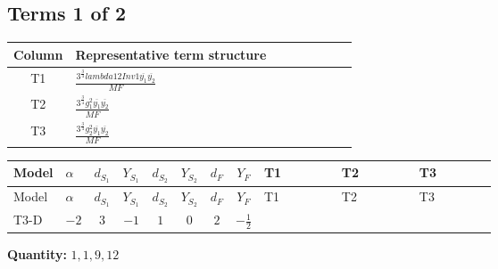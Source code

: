 \documentclass[8pt]{article}
\begin{document}
\begin{landscape}
\subsection*{Terms 1 of 2}
\begin{center}
\begin{tabular}{@{}c >{\raggedright\arraybackslash}p{0.82\linewidth}@{}}
\toprule
Column & Representative term structure \\
\midrule
T1 & \(\displaystyle \frac{3^{\frac{3}{4}} lambda12Inv1 \overline{y_{1}} \overline{y_{2}}}{MF}\) \\
\midrule
T2 & \(\displaystyle \frac{3^{\frac{3}{4}} g_{1}^{2} \overline{y_{1}} \overline{y_{2}}}{MF}\) \\
\midrule
T3 & \(\displaystyle \frac{3^{\frac{3}{4}} g_{2}^{2} \overline{y_{1}} \overline{y_{2}}}{MF}\) \\
\midrule
\bottomrule
\end{tabular}
\end{center}
\smallskip
\tiny
\begin{longtable}{@{}llcccccc >{\raggedright\arraybackslash}p{0.21\linewidth} >{\raggedright\arraybackslash}p{0.21\linewidth} >{\raggedright\arraybackslash}p{0.21\linewidth}@{}}
\toprule
Model & $\alpha$ & $d_{S_1}$ & $Y_{S_1}$ & $d_{S_2}$ & $Y_{S_2}$ & $d_F$ & $Y_F$ & T1 & T2 & T3 \\
\midrule
\endfirsthead
\toprule
Model & $\alpha$ & $d_{S_1}$ & $Y_{S_1}$ & $d_{S_2}$ & $Y_{S_2}$ & $d_F$ & $Y_F$ & T1 & T2 & T3 \\
\midrule
\endhead
T3-D & $-2$ & $3$ & $-1$ & $1$ & $0$ & $2$ & $-\frac{1}{2}$ & \scriptsize\adjustbox{max width=\linewidth}{$\begin{gathered} \frac{3^{\frac{3}{4}} lambda12Inv1 \overline{y_{1}} \overline{y_{2}}}{6 MF}\end{gathered}$} & \scriptsize\adjustbox{max width=\linewidth}{$\begin{gathered} \frac{3^{\frac{3}{4}} g_{1}^{2} \overline{y_{1}} \overline{y_{2}}}{8 MF}\end{gathered}$} & \scriptsize\adjustbox{max width=\linewidth}{$\begin{gathered} \frac{11 \cdot 3^{\frac{3}{4}} g_{2}^{2} \overline{y_{1}} \overline{y_{2}}}{8 MF}\end{gathered}$} \\
\midrule
\bottomrule
\end{longtable}
\clearpage
\noindent\textbf{Quantity: }$\mathrm{1,1,9,12}$\par\smallskip

\end{landscape}
\end{document}

